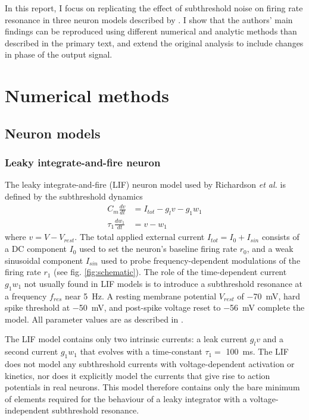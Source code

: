 \documentclass[12pt]{article}
\begin{document}
In this report, I focus on replicating the effect of subthreshold noise on firing rate resonance in three neuron models described by \cite{richardson_subthreshold_2003}.
I show that the authors' main findings can be reproduced using different numerical and analytic methods than described in the primary text, and extend the original analysis to include changes in phase of the output signal.



\section{Numerical methods}

\subsection{Neuron models}

\subsubsection{Leaky integrate-and-fire neuron}

The leaky integrate-and-fire (LIF) neuron model used by Richardson \textit{et al.} is defined by the subthreshold dynamics
\begin{align}
    C_m \frac{dv}{dt} &= I_{tot} - g_l v - g_1 w_1 \\
    \tau_1 \frac{dw_1}{dt} &= v - w_1
\end{align}
where $v = V - V_{rest}$.
The total applied external current $I_{tot} = I_0 + I_{sin}$ consists of a DC component $I_0$ used to set the neuron's baseline firing rate $r_0$, and a weak sinusoidal component $I_{sin}$ used to probe frequency-dependent modulations of the firing rate $r_1$ (see fig. \ref{fig:schematic}).
The role of the time-dependent current $g_1w_1$ not usually found in LIF models is to introduce a subthreshold resonance at  a frequency $f_{res}$ near \SI{5}{\Hz}.
A resting membrane potential $V_{rest}$ of \SI{-70}{\mV}, hard spike threshold at \SI{-50}{\mV}, and post-spike voltage reset to \SI{-56}{\mV} complete the model.
All parameter values are as described in \cite{richardson_subthreshold_2003}.

The LIF model contains only two intrinsic currents: a leak current $g_l v$ and a second current $g_1 w_1$ that evolves with a time-constant $\tau_1 = $ \SI{100}{\ms}.
The LIF does not model any subthreshold currents with voltage-dependent activation or kinetics, nor does it explicitly model the currents that give rise to action potentials in real neurons.
This model therefore contains only the bare minimum of elements required for the behaviour of a leaky integrator with a voltage-independent subthreshold resonance.
\end{document}
